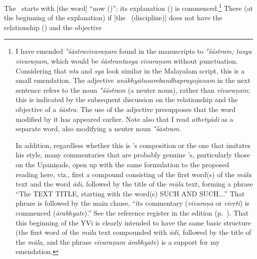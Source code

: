 The%
 \PYS\ starts with [the word] ``now (\atha{})'';  its explanation (\vivarana) is commenced.\footnote{\label{STRMTSY}I have emended \emph{°śāstravivaraṇam} found in the manuscripts to \emph{°śāstram; tasya vi\-va\-raṇam}, which would be \emph{śāstrantasya vivaraṇam} without punctuation.  Considering that \emph{nta} and \emph{sya} look similar in the Malayalam script, this is a small emendation.  The adjective \emph{anā\-khyā\-ta\-samba\-ndha\-pra\-yo\-janam} in the next sentence refers to the noun \emph{°śāstram} (a neuter noun), rather than \emph{vivaraṇam}; this is indicated by the subsequent discussion on the relationship and the objective of a \emph{śāstra}.  The use of the adjective presupposes that the word modified by it has appeared earlier.  Note also that I read \emph{athetyādi} as a separate word, also modifying a neuter noun \emph{°śāstram}.

In addition, regardless whether this is \Sankara's composition or the one that imitates his style, many commentaries that are probably genuine \Sankara's, particularly those on the Upaniṣads, open up with the same formulation to the proposed reading here, viz., first a compound consisting of the first word(s) of the \emph{mūla} text and the word \emph{ādi}, followed by the title of the \emph{mūla} text, forming a phrase ``The TEXT TITLE, starting with the word(s) SUCH AND SUCH\ldots.''  That phrase is followed by the main clause, ``its commentary (\emph{vivaraṇa} or \emph{vivṛti}) is commenced (\emph{ārabhyate}).''  See the reference register in the edition (p.~\pageref{FIRSTSTC}).  That this beginning of the YVi is clearly intended to have the same basic structure (the first word of the \emph{mūla} text compounded with \emph{ādi}, followed by the title of the \emph{mūla}, and the phrase \emph{vivaraṇam ārabhyate}) is a support for my emendation.}  There (at the beginning of the explanation) if [the \sastra\ (discipline)] does not have the relationship (\sambandha) and the objective
